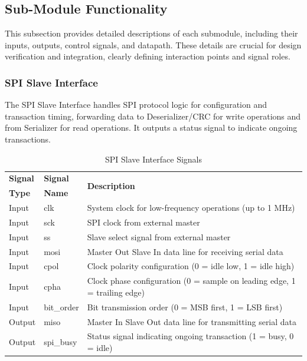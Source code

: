 \subsection{Sub-Module Functionality}

This subsection provides detailed descriptions of each submodule, including their inputs, outputs, control signals, and datapath. These details are crucial for design verification and integration, clearly defining interaction points and signal roles.

\subsubsection{SPI Slave Interface}
The SPI Slave Interface handles SPI protocol logic for configuration and transaction timing, forwarding data to Deserializer/CRC for write operations and from Serializer for read operations. It outputs a status signal to indicate ongoing transactions.

\begin{table}[!htb]
    \centering
    \caption{SPI Slave Interface Signals}
    \label{tab:spi-slave-interface-signals}
    \begin{tabular}{|m{}|m{}|m{}|}
        \hline
        \textbf{Signal} & \textbf{Signal} & \multirow{2}{*}{\textbf{Description}} \\
        \textbf{Type} & \textbf{Name} & \\
        \hline
        Input & clk & System clock for low-frequency operations (up to 1 MHz) \\
        Input & sck & SPI clock from external master \\
        Input & ss & Slave select signal from external master \\
        Input & mosi & Master Out Slave In data line for receiving serial data \\
        Input & cpol & Clock polarity configuration (0 = idle low, 1 = idle high) \\
        Input & cpha & Clock phase configuration (0 = sample on leading edge, 1 = trailing edge) \\
        Input & bit\_order & Bit transmission order (0 = MSB first, 1 = LSB first) \\
        Output & miso & Master In Slave Out data line for transmitting serial data \\
        Output & spi\_busy & Status signal indicating ongoing transaction (1 = busy, 0 = idle) \\
        \hline
    \end{tabular}
\end{table}

